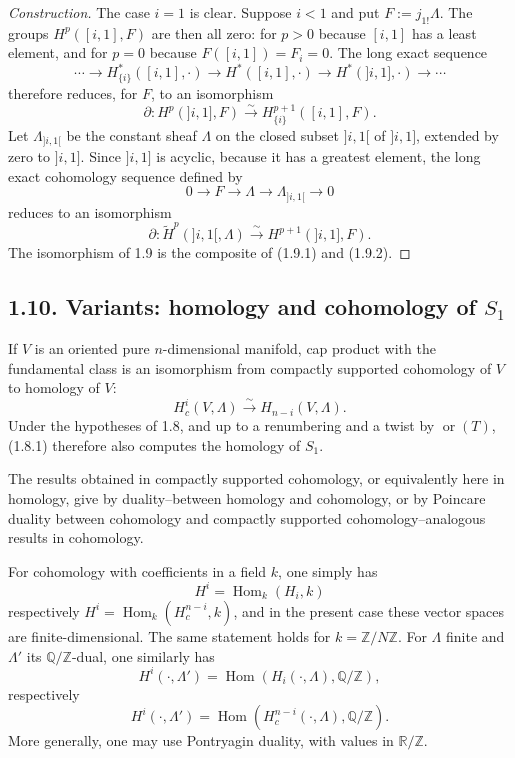 \documentclass[11pt]{article}
\theoremstyle{definition}
\newcommand{\ZZ}{\mathbb Z}
\newcommand{\QQ}{\mathbb Q}
\newcommand{\RR}{\mathbb R}
\newcommand{\Hom}{\operatorname{Hom}}
\newcommand{\ornt}{\operatorname{or}}
\begin{document}
\begin{proof}[Construction]
The case $i=1$ is clear.  Suppose $i<1$ and put $F:=j_{1!}\Lambda$.  The groups $H^p([i,1],F)$ are then all zero: for $p>0$ because $[i,1]$ has a least element, and for $p=0$ because $F([i,1])=F_i=0$.  The long exact sequence
\[
\cdots\to H^*_{\{i\}}([i,1],\cdot)\to H^*([i,1],\cdot)\to H^*(]i,1],\cdot)\to\cdots
\]
therefore reduces, for $F$, to an isomorphism
\begin{equation}
\partial:H^p(]i,1],F)\xrightarrow{\sim}H^{p+1}_{\{i\}}([i,1],F).\tag{1.9.1}
\end{equation}
Let $\Lambda_{]i,1[}$ be the constant sheaf $\Lambda$ on the closed subset $]i,1[$ of $]i,1]$, extended by zero to $]i,1]$.  Since $]i,1]$ is acyclic, because it has a greatest element, the long exact cohomology sequence defined by
\[
0\to F\to\Lambda\to\Lambda_{]i,1[}\to 0
\]
reduces to an isomorphism
\begin{equation}
\partial:\widetilde H^p(]i,1[,\Lambda)\xrightarrow{\sim}H^{p+1}(]i,1],F).\tag{1.9.2}
\end{equation}
The isomorphism of 1.9 is the composite of (1.9.1) and (1.9.2).
\end{proof}

\subsection*{1.10. Variants: homology and cohomology of $S_1$}
If $V$ is an oriented pure $n$-dimensional manifold, cap product with the fundamental class is an isomorphism from compactly supported cohomology of $V$ to homology of $V$:
\[
H_c^i(V,\Lambda)\xrightarrow{\sim}H_{n-i}(V,\Lambda).
\]
Under the hypotheses of 1.8, and up to a renumbering and a twist by $\ornt(T)$, (1.8.1) therefore also computes the homology of $S_1$.

The results obtained in compactly supported cohomology, or equivalently here in homology, give by duality--between homology and cohomology, or by Poincare duality between cohomology and compactly supported cohomology--analogous results in cohomology.

For cohomology with coefficients in a field $k$, one simply has
\[
H^i=\Hom_k(H_i,k)
\]
respectively $H^i=\Hom_k(H_c^{n-i},k)$, and in the present case these vector spaces are finite-dimensional.  The same statement holds for $k=\ZZ/N\ZZ$.  For $\Lambda$ finite and $\Lambda'$ its $\QQ/\ZZ$-dual, one similarly has
\[
H^i(\cdot,\Lambda')=\Hom(H_i(\cdot,\Lambda),\QQ/\ZZ),
\]
respectively
\[
H^i(\cdot,\Lambda')=\Hom(H_c^{n-i}(\cdot,\Lambda),\QQ/\ZZ).
\]
More generally, one may use Pontryagin duality, with values in $\RR/\ZZ$.
\end{document}
